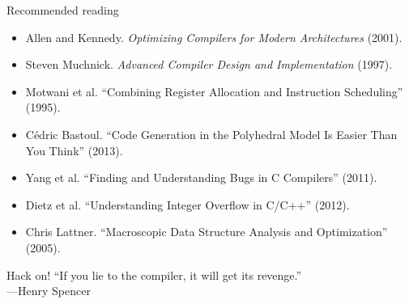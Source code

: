 \documentclass[mathserif,xcolor={dvipsnames,table}]{beamer}
\begin{document}
\begin{frame}{Recommended reading}
\tiny{
\begin{itemize}
\item Allen and Kennedy. \textit{Optimizing Compilers for Modern Architectures} (2001).
\item Steven Muchnick. \textit{Advanced Compiler Design and Implementation} (1997).
\item Motwani et al. ``Combining Register Allocation and Instruction Scheduling'' (1995).
\item C\'{e}dric Bastoul. ``Code Generation in the Polyhedral Model Is Easier Than You Think'' (2013).
\item Yang et al. ``Finding and Understanding Bugs in C Compilers'' (2011).
\item Dietz et al. ``Understanding Integer Overflow in C/C++'' (2012).
\item Chris Lattner. ``Macroscopic Data Structure Analysis and Optimization'' (2005).
\end{itemize}
}
\end{frame}

\begin{frame}{Hack on!}
``If you lie to the compiler, it will get its revenge.''\\
\hfill---Henry Spencer
\end{frame}
\end{document}
